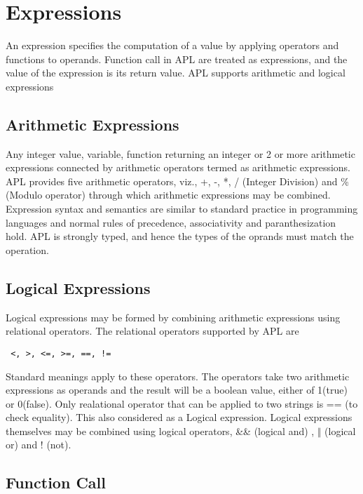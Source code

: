 \documentclass[11pt]{article}
\begin{document}
\section{Expressions}
An expression specifies the computation of a value by applying operators and functions to operands. Function call in APL are treated as expressions, and the value of the expression is its return value. APL supports arithmetic and logical expressions



\subsection{Arithmetic Expressions}
Any integer value, variable, function returning an integer or 2 or more arithmetic expressions connected by arithmetic operators termed as arithmetic expressions. APL provides five arithmetic operators, viz., +, -, *, / (Integer Division) and \% (Modulo operator) through which arithmetic expressions may be combined. Expression syntax and semantics are similar to standard practice in programming languages and normal rules of precedence, associativity and paranthesization hold. APL is strongly typed, and hence the types of the oprands must match the operation.


\subsection{Logical Expressions}

Logical expressions may be formed by combining arithmetic expressions using relational operators. The relational operators supported by APL are \begin{verbatim} <, >, <=, >=, ==, !=
\end{verbatim}
    
Standard meanings apply to these operators. The operators take two arithmetic expressions as operands and the result will be a boolean value, either of 1(true) or 0(false). Only realational operator that can be applied to two strings is == (to check equality). This also considered as a Logical expression. Logical expressions themselves may be combined using logical operators, \&\& (logical and) , $\Vert$ (logical or) and ! (not).




\subsection{Function Call}
\end{document}
